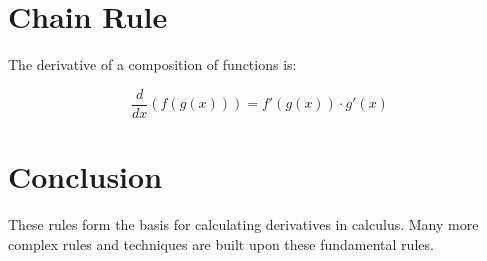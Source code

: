 \section{Chain Rule}

The derivative of a composition of functions is:

\begin{equation}
\frac{d}{dx}(f(g(x))) = f'(g(x)) \cdot g'(x)
\end{equation}

\section{Conclusion}

These rules form the basis for calculating derivatives in calculus. Many more complex rules and techniques are built upon these fundamental rules.
